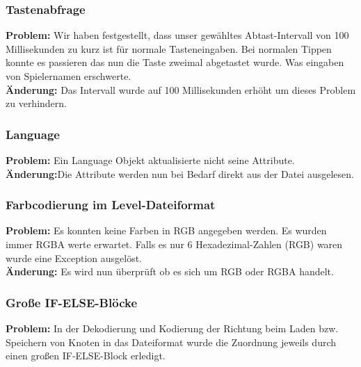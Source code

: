 
\subsubsection*{Tastenabfrage}
\textbf{Problem:}
Wir haben festgestellt, dass unser gewähltes Abtast-Intervall von 100 Millisekunden zu kurz ist für normale Tasteneingaben. Bei normalen Tippen konnte es passieren das nun die Taste zweimal abgetastet wurde. Was eingaben von Spielernamen erschwerte.\\

\textbf{Änderung:} Das Intervall wurde auf 100 Millisekunden erhöht um dieses Problem zu verhindern.\\



\subsubsection*{Language}
\textbf{Problem:}
Ein Language Objekt aktualisierte nicht seine Attribute.\\

\textbf{Änderung:}Die Attribute werden nun bei Bedarf direkt aus der Datei ausgelesen.\\



\subsubsection*{Farbcodierung im Level-Dateiformat}

\textbf{Problem:}
Es konnten keine Farben in RGB angegeben werden. Es wurden immer RGBA werte erwartet.
Falls es nur 6 Hexadezimal-Zahlen (RGB) waren wurde eine Exception ausgelöst.\\

\textbf{Änderung:} Es wird nun überprüft ob es sich um RGB oder RGBA handelt.\\



\subsubsection*{Große IF-ELSE-Blöcke}
\textbf{Problem:}
In der Dekodierung und Kodierung der Richtung beim Laden bzw. Speichern von Knoten in das Dateiformat wurde die Zuordnung jeweils durch einen großen IF-ELSE-Block erledigt.\\

